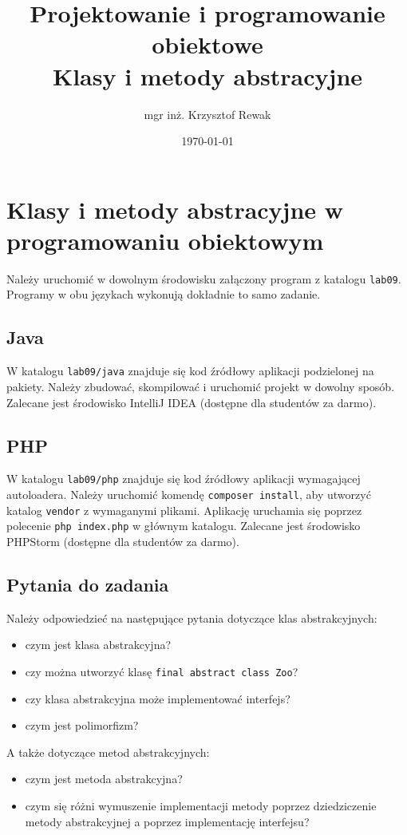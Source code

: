\documentclass{article}
\title{
	Projektowanie i programowanie obiektowe \\
	\Huge{Klasy i metody abstracyjne}
}
\author{mgr inż. Krzysztof Rewak}
\date{\today}
\begin{document}
	\maketitle
	
	\section{Klasy i metody abstracyjne w programowaniu obiektowym}
	Należy uruchomić w dowolnym środowisku załączony program z katalogu \texttt{lab09}. Programy w obu językach wykonują dokładnie to samo zadanie.
	
	\subsection{Java}
	W katalogu \texttt{lab09/java} znajduje się kod źródłowy aplikacji podzielonej na pakiety. Należy zbudować, skompilować i uruchomić projekt w dowolny sposób. Zalecane jest środowisko IntelliJ IDEA (dostępne dla studentów za darmo).
	
	\subsection{PHP}
	W katalogu \texttt{lab09/php} znajduje się kod źródłowy aplikacji wymagającej autoloadera. Należy uruchomić komendę \texttt{composer install}, aby utworzyć katalog \texttt{vendor} z wymaganymi plikami. Aplikację uruchamia się poprzez polecenie \texttt{php index.php} w głównym katalogu. Zalecane jest środowisko PHPStorm (dostępne dla studentów za darmo).
	
	\subsection{Pytania do zadania}
	Należy odpowiedzieć na następujące pytania dotyczące klas abstrakcyjnych:
	\begin{itemize}
		\item czym jest klasa abstrakcyjna?
		\item czy można utworzyć klasę \texttt{final abstract class Zoo}?
		\item czy klasa abstrakcyjna może implementować interfejs?
		\item czym jest polimorfizm?
	\end{itemize}
	
	A także dotyczące metod abstrakcyjnych:
	
	\begin{itemize}
		\item czym jest metoda abstrakcyjna?
		\item czym się różni wymuszenie implementacji metody poprzez dziedziczenie metody abstrakcyjnej a poprzez implementację interfejsu?
	\end{itemize}
	
\end{document}
